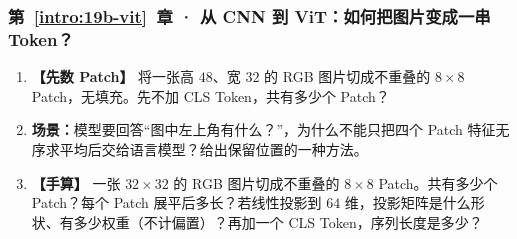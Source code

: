 \subsubsection*{第~\ref*{intro:19b-vit}~章 · 从 CNN 到 ViT：如何把图片变成一串 Token？}
\begin{enumerate}[label={},leftmargin=4.8em,itemsep=4pt]
\item[\textbf{C-127.}] \leavevmode{}\label{exercise:C-127}\label{exercise:rectangular-patch-count}\textbf{【先数 Patch】} 将一张高 $48$、宽 $32$ 的 RGB 图片切成不重叠的 $8\times8$ Patch，无填充。先不加 CLS Token，共有多少个 Patch？
\item[\textbf{C-128.}] \leavevmode{}\label{exercise:C-128}\label{exercise:vit-spatial-order}\textbf{场景：}模型要回答“图中左上角有什么？”，为什么不能只把四个 Patch 特征无序求平均后交给语言模型？给出保留位置的一种方法。
\item[\textbf{C-129.}] \leavevmode{}\label{exercise:C-129}\label{exercise:patch-projection-count}\textbf{【手算】} 一张 $32\times32$ 的 RGB 图片切成不重叠的 $8\times8$ Patch。共有多少个 Patch？每个 Patch 展平后多长？若线性投影到 $64$ 维，投影矩阵是什么形状、有多少权重（不计偏置）？再加一个 CLS Token，序列长度是多少？
\end{enumerate}
